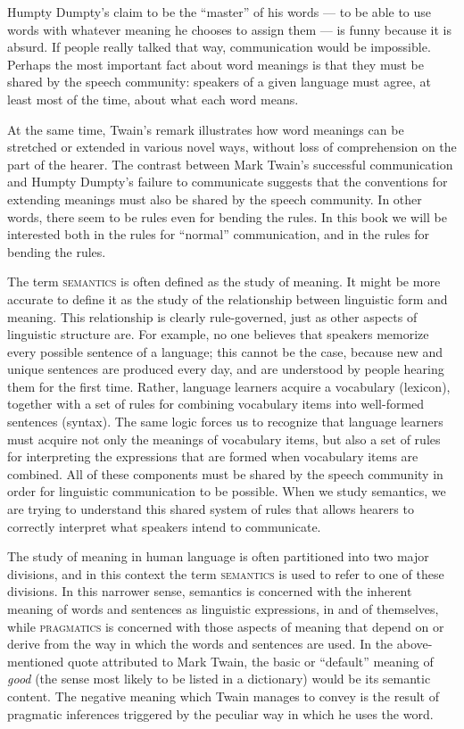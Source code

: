 Humpty Dumpty’s claim to be the “master” of his words — to be able to use words with whatever meaning he chooses to assign them — is funny because it is absurd. If people really talked that way, communication would be impossible. Perhaps the most important fact about word meanings is that they must be shared by the speech community: speakers of a given language must agree, at least most of the time, about what each word means.



At the same time, Twain’s remark illustrates how word meanings can be stretched or extended in various novel ways, without loss of comprehension on the part of the hearer. The contrast between Mark Twain’s successful communication and Humpty Dumpty’s failure to communicate suggests that the conventions for extending meanings must also be shared by the speech community. In other words, there seem to be rules even for bending the rules. In this book we will be interested both in the rules for “normal” communication, and in the rules for bending the rules.



The term \textsc{semantics} is often defined as the study of meaning. It might be more accurate to define it as the study of the relationship between linguistic form and meaning. This relationship is clearly rule-governed, just as other aspects of linguistic structure are. For example, no one believes that speakers memorize every possible sentence of a language; this cannot be the case, because new and unique sentences are produced every day, and are understood by people hearing them for the first time. Rather, language learners acquire a vocabulary (lexicon), together with a set of rules for combining vocabulary items into well-formed sentences (syntax). The same logic forces us to recognize that language learners must acquire not only the meanings of vocabulary items, but also a set of rules for interpreting the expressions that are formed when vocabulary items are combined. All of these components must be shared by the speech community in order for linguistic communication to be possible. When we study semantics, we are trying to understand this shared system of rules that allows hearers to correctly interpret what speakers intend to communicate.



The study of meaning in human language is often partitioned into two major divisions, and in this context the term \textsc{semantics} is used to refer to one of these divisions. In this narrower sense, semantics is concerned with the inherent meaning of words and sentences as linguistic expressions, in and of themselves, while \textsc{pragmatics} is concerned with those aspects of meaning that depend on or derive from the way in which the words and sentences are used. In the above-mentioned quote attributed to Mark Twain, the basic or “default” meaning of \textit{good} (the sense most likely to be listed in a dictionary) would be its semantic content. The negative meaning which Twain manages to convey is the result of pragmatic inferences triggered by the peculiar way in which he uses the word.



